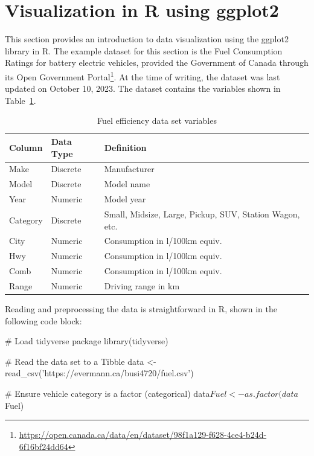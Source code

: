 \section{Visualization in R using ggplot2}

This section provides an introduction to data visualization using the ggplot2 library in R. The example dataset for this section is the Fuel Consumption Ratings for battery electric vehicles, provided the Government of Canada through its Open Government Portal\footnote{\scriptsize\url{https://open.canada.ca/data/en/dataset/98f1a129-f628-4ce4-b24d-6f16bf24dd64}}. At the time of writing, the dataset was last updated on October 10, 2023. The dataset contains the variables shown in Table~\ref{tab:fueldata}.

\begin{table}[h]
\centering
\renewcommand{\arraystretch}{1.25}

\begin{tabularx}{\linewidth}{|l|l|X|} \hline
  {\bf Column} & {\bf Data Type} & {\bf Definition} \\ \hline \hline
  Make & Discrete & Manufacturer \\ 
  Model & Discrete & Model name\\
  Year & Numeric & Model year \\
  Category & Discrete & Small, Midsize, Large, Pickup, SUV, Station Wagon, etc. \\
  City & Numeric & Consumption in l/100km equiv. \\
  Hwy & Numeric & Consumption in l/100km equiv. \\
  Comb & Numeric & Consumption in l/100km equiv. \\
  Range & Numeric & Driving range in km \\ \hline
\end{tabularx}
\caption{Fuel efficiency data set variables}
\label{tab:fueldata}
\end{table}

\noindent Reading and preprocessing the data is straightforward in R, shown in the following code block:

\begin{Rcode}
# Load tidyverse package
library(tidyverse)

# Read the data set to a Tibble
data <- read_csv('https://evermann.ca/busi4720/fuel.csv')

# Ensure vehicle category is a factor (categorical)
data$Fuel <- as.factor(data$Fuel)
\end{Rcode}

